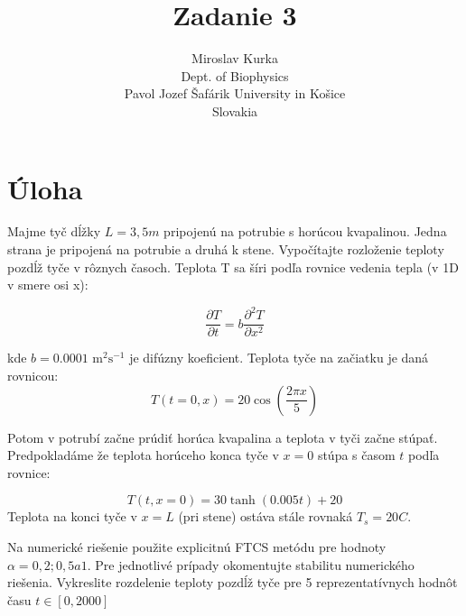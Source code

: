 \documentclass{article}
\title{Zadanie 3}
\author{Miroslav Kurka\\
  \small Dept. of Biophysics\\
  \small Pavol Jozef Šafárik University in Košice\\
  \small Slovakia 
}
\theoremstyle{definition}
\theoremstyle{remark}
\begin{document}
\maketitle


\section{Úloha}
Majme tyč dĺžky $L = 3,5 m$ pripojenú na potrubie s horúcou kvapalinou. Jedna strana je
pripojená na potrubie a druhá k stene. Vypočítajte rozloženie teploty pozdĺž tyče
v rôznych časoch.
Teplota T sa šíri podľa rovnice vedenia tepla (v 1D v smere osi x):

$$\frac{\partial T}{\partial t} = b \frac{\partial^2 T}{\partial x^2}$$


kde $b = 0.0001 \text{ m}^2\text{s}^{-1}$ je difúzny koeficient. Teplota tyče na začiatku je daná rovnicou:
$$T(t=0,x) = 20\cos\left(\frac{2\pi x}{5}\right)$$

Potom v potrubí začne prúdiť horúca kvapalina a teplota v tyči začne stúpať.
Predpokladáme že teplota horúceho konca tyče v $x = 0$ stúpa s časom $t$ podľa rovnice:

$$T(t,x=0) = 30 \tanh(0.005t) + 20$$
Teplota na konci tyče v $x = L$ (pri stene) ostáva stále rovnaká $T_s = 20C$.

Na numerické riešenie použite explicitnú FTCS metódu pre hodnoty $\alpha = 0,2; 0,5 a 1$.
Pre jednotlivé prípady okomentujte stabilitu numerického riešenia. Vykreslite
rozdelenie teploty pozdĺž tyče pre 5 reprezentatívnych hodnôt času $t \in [0, 2000]$
\end{document}
